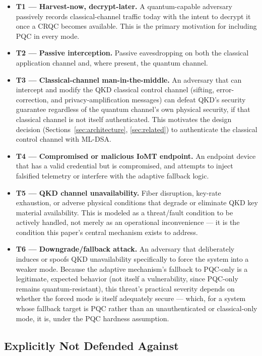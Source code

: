 \documentclass[journal]{IEEEtran}
\begin{document}
\begin{itemize}
\item \textbf{T1 --- Harvest-now, decrypt-later.} A quantum-capable adversary passively records classical-channel traffic today with the intent to decrypt it once a CRQC becomes available. This is the primary motivation for including PQC in every mode.
\item \textbf{T2 --- Passive interception.} Passive eavesdropping on both the classical application channel and, where present, the quantum channel.
\item \textbf{T3 --- Classical-channel man-in-the-middle.} An adversary that can intercept and modify the QKD classical control channel (sifting, error-correction, and privacy-amplification messages) can defeat QKD's security guarantee regardless of the quantum channel's own physical security, if that classical channel is not itself authenticated. This motivates the design decision (Sections~\ref{sec:architecture}, \ref{sec:related}) to authenticate the classical control channel with ML-DSA.
\item \textbf{T4 --- Compromised or malicious IoMT endpoint.} An endpoint device that has a valid credential but is compromised, and attempts to inject falsified telemetry or interfere with the adaptive fallback logic.
\item \textbf{T5 --- QKD channel unavailability.} Fiber disruption, key-rate exhaustion, or adverse physical conditions that degrade or eliminate QKD key material availability. This is modeled as a threat/fault condition to be actively handled, not merely as an operational inconvenience --- it is the condition this paper's central mechanism exists to address.
\item \textbf{T6 --- Downgrade/fallback attack.} An adversary that deliberately induces or spoofs QKD unavailability specifically to force the system into a weaker mode. Because the adaptive mechanism's fallback to PQC-only is a legitimate, expected behavior (not itself a vulnerability, since PQC-only remains quantum-resistant), this threat's practical severity depends on whether the forced mode is itself adequately secure --- which, for a system whose fallback target is PQC rather than an unauthenticated or classical-only mode, it is, under the PQC hardness assumption.
\end{itemize}

\subsection{Explicitly Not Defended Against}
\end{document}
